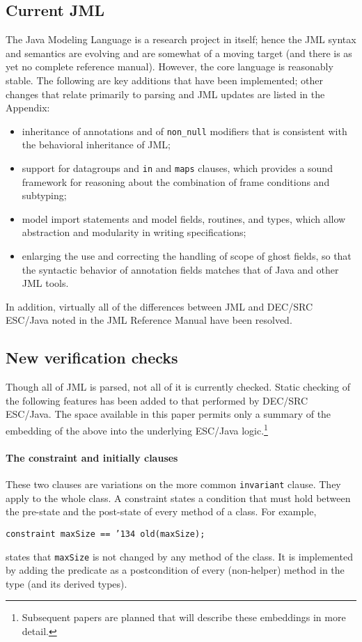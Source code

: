 \documentclass{article}
\begin{document}
\subsection{Current JML}
The Java Modeling Language is a research project in itself; hence the
JML syntax and semantics are evolving and are somewhat of a moving
target (and there is as yet no complete reference manual).  However,
the core language is reasonably stable.  The following are key
additions that have been implemented; other changes that relate primarily
to parsing and JML updates are listed in the Appendix:

\setlength{\partopsep}{0in}\setlength{\parskip}{0in}\setlength{\itemsep}{0in}\setlength{\topsep}{0in}
\begin{itemize}
\setlength{\partopsep}{0in}\setlength{\parskip}{0in}\setlength{\itemsep}{0in}\setlength{\topsep}{0in}
\item inheritance of annotations and of \texttt{non\_null}
  modifiers that is consistent with the behavioral inheritance of JML;
\item support for datagroups and \texttt{in} and \texttt{maps} clauses, which provides a sound framework for reasoning about the combination of frame conditions and subtyping;
\item model import statements and model fields, routines, and types, which allow abstraction 
and modularity in writing specifications;
\item enlarging the use and correcting the handling of scope of ghost fields, so that the syntactic behavior 
of annotation fields matches that of Java and other JML tools.
\end{itemize}
In addition, virtually all of the differences between JML and DEC/SRC ESC/Java
noted in the JML Reference Manual have been resolved.

\subsection{New verification checks}
Though all of JML is parsed, not all of it is currently checked.
Static checking of the following features has been added to that performed by
DEC/SRC ESC/Java.  The space available in this paper permits only
a summary of the embedding of the above into the underlying ESC/Java 
logic.\footnote{Subsequent papers are planned that will describe these embeddings in more detail.}  

\paragraph*{The constraint and initially clauses}
These two clauses are variations on the more common \texttt{invariant} clause.  They apply to the whole class.  A constraint states a condition that must hold between the pre-state and the post-state of every method of a class.  For example,
\begin{center}
\texttt{constraint maxSize == \char'134 old(maxSize); }
\end{center}
states that \texttt{maxSize} is not changed by any method of the class.  It is implemented by 
adding the predicate as a postcondition of every (non-helper) method in the type (and its derived types).
\end{document}
